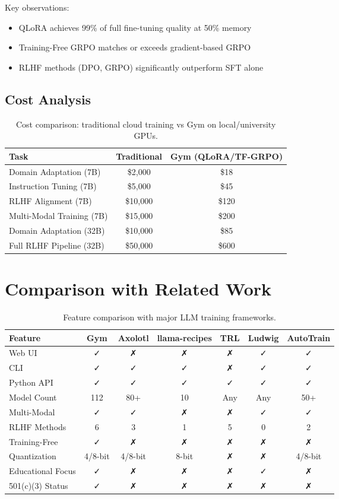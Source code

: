\documentclass[11pt,letterpaper]{article}
\begin{document}
Key observations:
\begin{itemize}
\item QLoRA achieves 99\% of full fine-tuning quality at 50\% memory
\item Training-Free GRPO matches or exceeds gradient-based GRPO
\item RLHF methods (DPO, GRPO) significantly outperform SFT alone
\end{itemize}

\subsection{Cost Analysis}

\begin{table}[h]
\centering
\begin{tabular}{lcc}
\toprule
Task & Traditional & Gym (QLoRA/TF-GRPO) \\
\midrule
Domain Adaptation (7B) & \$2,000 & \$18 \\
Instruction Tuning (7B) & \$5,000 & \$45 \\
RLHF Alignment (7B) & \$10,000 & \$120 \\
Multi-Modal Training (7B) & \$15,000 & \$200 \\
\midrule
Domain Adaptation (32B) & \$10,000 & \$85 \\
Full RLHF Pipeline (32B) & \$50,000 & \$600 \\
\bottomrule
\end{tabular}
\caption{Cost comparison: traditional cloud training vs Gym on local/university GPUs.}
\end{table}

\section{Comparison with Related Work}

\begin{table}[h]
\centering
\small
\begin{tabular}{lcccccc}
\toprule
Feature & Gym & Axolotl & llama-recipes & TRL & Ludwig & AutoTrain \\
\midrule
Web UI & ✓ & ✗ & ✗ & ✗ & ✓ & ✓ \\
CLI & ✓ & ✓ & ✓ & ✗ & ✓ & ✓ \\
Python API & ✓ & ✓ & ✓ & ✓ & ✓ & ✓ \\
Model Count & 112 & 80+ & 10 & Any & Any & 50+ \\
Multi-Modal & ✓ & ✓ & ✗ & ✗ & ✓ & ✓ \\
RLHF Methods & 6 & 3 & 1 & 5 & 0 & 2 \\
Training-Free & ✓ & ✗ & ✗ & ✗ & ✗ & ✗ \\
Quantization & 4/8-bit & 4/8-bit & 8-bit & ✗ & ✗ & 4/8-bit \\
Educational Focus & ✓ & ✗ & ✗ & ✗ & ✓ & ✗ \\
501(c)(3) Status & ✓ & ✗ & ✗ & ✗ & ✗ & ✗ \\
\bottomrule
\end{tabular}
\caption{Feature comparison with major LLM training frameworks.}
\end{table}
\end{document}
